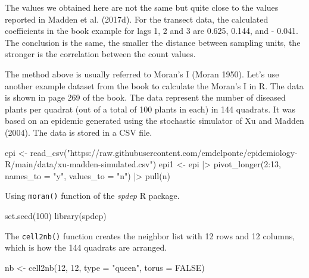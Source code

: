 \documentclass[
  letterpaper,
  DIV=11,
  numbers=noendperiod]{scrreprt}
\newenvironment{Shaded}{\begin{snugshade}}{\end{snugshade}}
\newcommand{\AttributeTok}[1]{\textcolor[rgb]{0.40,0.45,0.13}{#1}}
\newcommand{\ConstantTok}[1]{\textcolor[rgb]{0.56,0.35,0.01}{#1}}
\newcommand{\DecValTok}[1]{\textcolor[rgb]{0.68,0.00,0.00}{#1}}
\newcommand{\FunctionTok}[1]{\textcolor[rgb]{0.28,0.35,0.67}{#1}}
\newcommand{\NormalTok}[1]{\textcolor[rgb]{0.00,0.23,0.31}{#1}}
\newcommand{\OtherTok}[1]{\textcolor[rgb]{0.00,0.23,0.31}{#1}}
\newcommand{\SpecialCharTok}[1]{\textcolor[rgb]{0.37,0.37,0.37}{#1}}
\newcommand{\StringTok}[1]{\textcolor[rgb]{0.13,0.47,0.30}{#1}}
\begin{document}
The values we obtained here are not the same but quite close to the
values reported in Madden et al. (2017d). For the transect data, the
calculated coefficients in the book example for lags 1, 2 and 3 are
0.625, 0.144, and - 0.041. The conclusion is the same, the smaller the
distance between sampling units, the stronger is the correlation between
the count values.

The method above is usually referred to Moran's I (Moran 1950). Let's
use another example dataset from the book to calculate the Moran's I in
R. The data is shown in page 269 of the book. The data represent the
number of diseased plants per quadrat (out of a total of 100 plants in
each) in 144 quadrats. It was based on an epidemic generated using the
stochastic simulator of Xu and Madden (2004). The data is stored in a
CSV file.

\begin{Shaded}
\begin{Highlighting}[]
\NormalTok{epi }\OtherTok{\textless{}{-}} \FunctionTok{read\_csv}\NormalTok{(}\StringTok{"https://raw.githubusercontent.com/emdelponte/epidemiology{-}R/main/data/xu{-}madden{-}simulated.csv"}\NormalTok{)}
\NormalTok{epi1 }\OtherTok{\textless{}{-}}\NormalTok{ epi }\SpecialCharTok{|\textgreater{}}
  \FunctionTok{pivot\_longer}\NormalTok{(}\DecValTok{2}\SpecialCharTok{:}\DecValTok{13}\NormalTok{,}
               \AttributeTok{names\_to =} \StringTok{"y"}\NormalTok{,}
               \AttributeTok{values\_to =} \StringTok{"n"}\NormalTok{) }\SpecialCharTok{|\textgreater{}}
  \FunctionTok{pull}\NormalTok{(n)}
\end{Highlighting}
\end{Shaded}

Using \texttt{moran()} function of the \emph{spdep} R package.

\begin{Shaded}
\begin{Highlighting}[]
\FunctionTok{set.seed}\NormalTok{(}\DecValTok{100}\NormalTok{)}
\FunctionTok{library}\NormalTok{(spdep)}
\end{Highlighting}
\end{Shaded}

The \texttt{cell2nb()} function creates the neighbor list with 12 rows
and 12 columns, which is how the 144 quadrats are arranged.

\begin{Shaded}
\begin{Highlighting}[]
\NormalTok{nb }\OtherTok{\textless{}{-}} \FunctionTok{cell2nb}\NormalTok{(}\DecValTok{12}\NormalTok{, }\DecValTok{12}\NormalTok{, }\AttributeTok{type =} \StringTok{"queen"}\NormalTok{, }\AttributeTok{torus =} \ConstantTok{FALSE}\NormalTok{)}
\end{Highlighting}
\end{Shaded}
\end{document}
